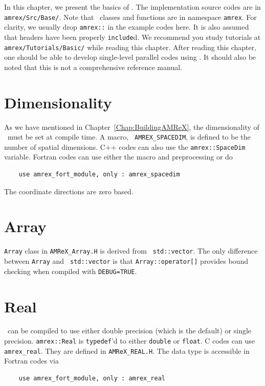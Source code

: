 In this chapter, we present the basics of \amrex.  The implementation
source codes are in {\tt amrex/Src/Base/}.  Note that \amrex\ classes
and functions are in namespace {\tt amrex}.  For clarity, we usually
drop {\tt amrex::} in the example codes here.  It is also assumed that
headers have been properly {\tt include}d.  We recommend you study
tutorials at {\tt amrex/Tutorials/Basic/} while reading this chapter.
After reading this chapter, one should be able to develop single-level
parallel codes using \amrex.  It should also be noted that this is not
a comprehensive reference manual.

\section{Dimensionality}
\label{sec:basics:dim}

As we have mentioned in Chapter~\ref{Chap:BuildingAMReX}, the
dimensionality of \amrex\ must be set at compile time.  A macro, {\tt
  AMREX\_SPACEDIM}, is defined to be the number of spatial
dimensions.  C++ codes can also use the {\tt amrex::SpaceDim}
variable.  Fortran codes can use either the macro and preprocessing or
do 
\begin{verbatim}
    use amrex_fort_module, only : amrex_spacedim
\end{verbatim}
The coordinate directions are zero based.

\section{Array}

{\tt Array} class in {\tt AMReX\_Array.H} is derived from {\tt
  std::vector}.  The only difference between {\tt Array} and {\tt
  std::vector} is that {\tt Array::operator[]} provides bound checking
when compiled with {\tt DEBUG=TRUE}.

\section{Real}

\amrex\ can be compiled to use either double precision (which is the
default) or single precision.  {\tt amrex::Real} is {\tt typedef}'d to
either {\tt double} or {\tt float}.  C codes can use {\tt
  amrex\_real}.  They are defined in {\tt AMReX\_REAL.H}.  The data
type is accessible in Fortran codes via
\begin{verbatim}
    use amrex_fort_module, only : amrex_real
\end{verbatim}

